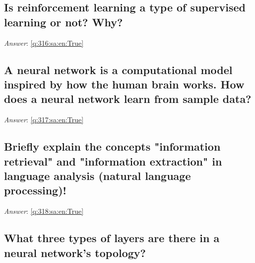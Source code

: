 \documentclass[a4paper,11pt,oneside]{article}
\begin{document}
\begin{sloppypar}
\subsection{Is reinforcement learning a type of supervised learning or not? Why?}

\label{q:316:sa:en:False}

\vspace{2cm}

\noindent\makebox[\textwidth]{\hrulefill}

\vspace{1cm}

\textit{Answer}: \autoref{q:316:sa:en:True}



\subsection{A neural network is a computational model inspired by how the human brain works. How does a neural network learn from sample data?}

\label{q:317:sa:en:False}

\vspace{2cm}

\noindent\makebox[\textwidth]{\hrulefill}

\vspace{1cm}

\textit{Answer}: \autoref{q:317:sa:en:True}



\subsection{Briefly explain the concepts "information retrieval" and "information extraction" in language analysis (natural language processing)!}

\label{q:318:sa:en:False}

\vspace{2cm}

\noindent\makebox[\textwidth]{\hrulefill}

\vspace{1cm}

\textit{Answer}: \autoref{q:318:sa:en:True}



\subsection{What three types of layers are there in a neural network's topology?}


\end{sloppypar}
\end{document}

